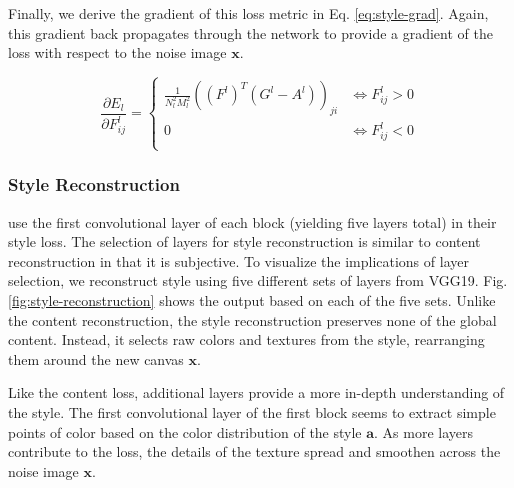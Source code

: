 \documentclass{article}
\begin{document}
Finally, we derive the gradient of this loss metric in Eq.
\ref{eq:style-grad}. Again, this gradient back propagates through the network
to provide a gradient of the loss with respect to the noise image
$\textbf{x}$.

\begin{equation}
\label{eq:style-grad}
\frac{\partial E_l}{\partial F^l_{ij}} =
\begin{cases}
    \frac{1}{N^2_l M^2_l}((F^l)^T (G^l - A^l))_{ji} & \iff F^l_{ij} > 0 \\
    0 & \iff F^l_{ij} < 0 \\
\end{cases}
\end{equation}

\subsubsection{Style Reconstruction}

\cite{2015arXiv150806576G} use the first convolutional layer of each block
(yielding five layers total) in their style loss. The selection of layers
for style reconstruction is similar to content reconstruction in that it is
subjective. To visualize the implications of layer selection, we reconstruct
style using five different sets of layers from VGG19. Fig.
\ref{fig:style-reconstruction} shows the output based on each of the five
sets. Unlike the content reconstruction, the style reconstruction preserves
none of the global content. Instead, it selects raw colors and textures from
the style, rearranging them around the new canvas $\textbf{x}$.

Like the content loss, additional layers provide a more in-depth understanding
of the style. The first convolutional layer of the first block seems to
extract simple points of color based on the color distribution of the style
$\textbf{a}$. As more layers contribute to the loss, the details of the
texture spread and smoothen across the noise image $\textbf{x}$.
\end{document}
